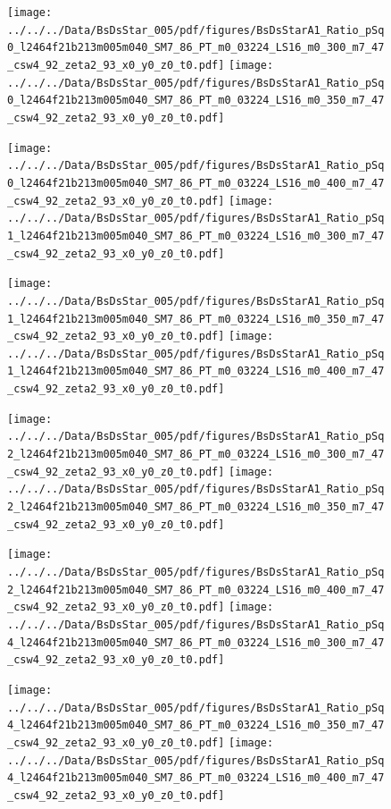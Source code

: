 \documentclass[a4paper,10pt]{article}
\begin{document}
\begin{figure}[p]
 \texttt{[image: ../../../Data/BsDsStar\_005/pdf/figures/BsDsStarA1\_Ratio\_pSq0\_l2464f21b213m005m040\_SM7\_86\_PT\_m0\_03224\_LS16\_m0\_300\_m7\_47\_csw4\_92\_zeta2\_93\_x0\_y0\_z0\_t0.pdf]} 
 \texttt{[image: ../../../Data/BsDsStar\_005/pdf/figures/BsDsStarA1\_Ratio\_pSq0\_l2464f21b213m005m040\_SM7\_86\_PT\_m0\_03224\_LS16\_m0\_350\_m7\_47\_csw4\_92\_zeta2\_93\_x0\_y0\_z0\_t0.pdf]} 
 \end{figure}
\begin{figure}[p]
 \texttt{[image: ../../../Data/BsDsStar\_005/pdf/figures/BsDsStarA1\_Ratio\_pSq0\_l2464f21b213m005m040\_SM7\_86\_PT\_m0\_03224\_LS16\_m0\_400\_m7\_47\_csw4\_92\_zeta2\_93\_x0\_y0\_z0\_t0.pdf]} 
 \texttt{[image: ../../../Data/BsDsStar\_005/pdf/figures/BsDsStarA1\_Ratio\_pSq1\_l2464f21b213m005m040\_SM7\_86\_PT\_m0\_03224\_LS16\_m0\_300\_m7\_47\_csw4\_92\_zeta2\_93\_x0\_y0\_z0\_t0.pdf]} 
 \end{figure}
\begin{figure}[p]
 \texttt{[image: ../../../Data/BsDsStar\_005/pdf/figures/BsDsStarA1\_Ratio\_pSq1\_l2464f21b213m005m040\_SM7\_86\_PT\_m0\_03224\_LS16\_m0\_350\_m7\_47\_csw4\_92\_zeta2\_93\_x0\_y0\_z0\_t0.pdf]} 
 \texttt{[image: ../../../Data/BsDsStar\_005/pdf/figures/BsDsStarA1\_Ratio\_pSq1\_l2464f21b213m005m040\_SM7\_86\_PT\_m0\_03224\_LS16\_m0\_400\_m7\_47\_csw4\_92\_zeta2\_93\_x0\_y0\_z0\_t0.pdf]} 
 \end{figure}
\clearpage
\begin{figure}[p]
 \texttt{[image: ../../../Data/BsDsStar\_005/pdf/figures/BsDsStarA1\_Ratio\_pSq2\_l2464f21b213m005m040\_SM7\_86\_PT\_m0\_03224\_LS16\_m0\_300\_m7\_47\_csw4\_92\_zeta2\_93\_x0\_y0\_z0\_t0.pdf]} 
 \texttt{[image: ../../../Data/BsDsStar\_005/pdf/figures/BsDsStarA1\_Ratio\_pSq2\_l2464f21b213m005m040\_SM7\_86\_PT\_m0\_03224\_LS16\_m0\_350\_m7\_47\_csw4\_92\_zeta2\_93\_x0\_y0\_z0\_t0.pdf]} 
 \end{figure}
\begin{figure}[p]
 \texttt{[image: ../../../Data/BsDsStar\_005/pdf/figures/BsDsStarA1\_Ratio\_pSq2\_l2464f21b213m005m040\_SM7\_86\_PT\_m0\_03224\_LS16\_m0\_400\_m7\_47\_csw4\_92\_zeta2\_93\_x0\_y0\_z0\_t0.pdf]} 
 \texttt{[image: ../../../Data/BsDsStar\_005/pdf/figures/BsDsStarA1\_Ratio\_pSq4\_l2464f21b213m005m040\_SM7\_86\_PT\_m0\_03224\_LS16\_m0\_300\_m7\_47\_csw4\_92\_zeta2\_93\_x0\_y0\_z0\_t0.pdf]} 
 \end{figure}
\begin{figure}[p]
 \texttt{[image: ../../../Data/BsDsStar\_005/pdf/figures/BsDsStarA1\_Ratio\_pSq4\_l2464f21b213m005m040\_SM7\_86\_PT\_m0\_03224\_LS16\_m0\_350\_m7\_47\_csw4\_92\_zeta2\_93\_x0\_y0\_z0\_t0.pdf]} 
 \texttt{[image: ../../../Data/BsDsStar\_005/pdf/figures/BsDsStarA1\_Ratio\_pSq4\_l2464f21b213m005m040\_SM7\_86\_PT\_m0\_03224\_LS16\_m0\_400\_m7\_47\_csw4\_92\_zeta2\_93\_x0\_y0\_z0\_t0.pdf]} 
 \end{figure}
\end{document}
